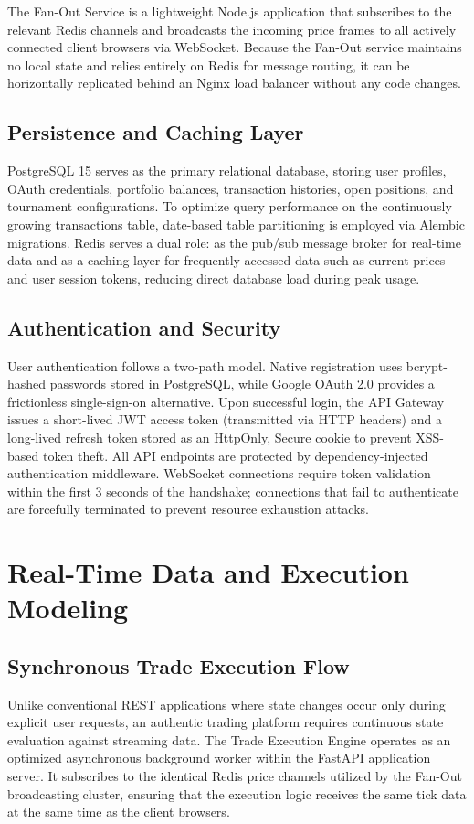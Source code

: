 \documentclass[conference]{IEEEtran}
\begin{document}
The Fan-Out Service is a lightweight Node.js application that subscribes to the relevant Redis channels and broadcasts the incoming price frames to all actively connected client browsers via WebSocket. Because the Fan-Out service maintains no local state and relies entirely on Redis for message routing, it can be horizontally replicated behind an Nginx load balancer without any code changes.

\subsection{Persistence and Caching Layer}
PostgreSQL 15 serves as the primary relational database, storing user profiles, OAuth credentials, portfolio balances, transaction histories, open positions, and tournament configurations. To optimize query performance on the continuously growing transactions table, date-based table partitioning is employed via Alembic migrations. Redis serves a dual role: as the pub/sub message broker for real-time data and as a caching layer for frequently accessed data such as current prices and user session tokens, reducing direct database load during peak usage.

\subsection{Authentication and Security}
User authentication follows a two-path model. Native registration uses bcrypt-hashed passwords stored in PostgreSQL, while Google OAuth 2.0 provides a frictionless single-sign-on alternative. Upon successful login, the API Gateway issues a short-lived JWT access token (transmitted via HTTP headers) and a long-lived refresh token stored as an HttpOnly, Secure cookie to prevent XSS-based token theft. All API endpoints are protected by dependency-injected authentication middleware. WebSocket connections require token validation within the first 3 seconds of the handshake; connections that fail to authenticate are forcefully terminated to prevent resource exhaustion attacks.

\section{Real-Time Data and Execution Modeling}

\subsection{Synchronous Trade Execution Flow}
Unlike conventional REST applications where state changes occur only during explicit user requests, an authentic trading platform requires continuous state evaluation against streaming data. The Trade Execution Engine operates as an optimized asynchronous background worker within the FastAPI application server. It subscribes to the identical Redis price channels utilized by the Fan-Out broadcasting cluster, ensuring that the execution logic receives the same tick data at the same time as the client browsers.
\end{document}
